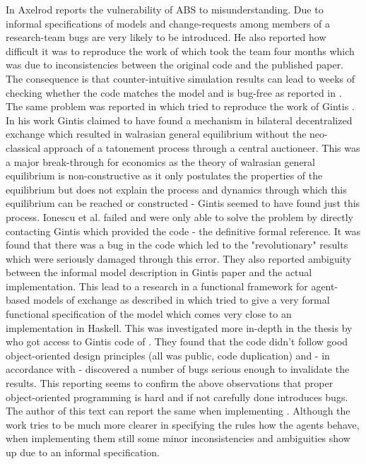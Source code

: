 In \cite{axelrod_chapter_2006} Axelrod reports the vulnerability of ABS to misunderstanding. Due to informal specifications of models and change-requests among members of a research-team bugs are very likely to be introduced. He also reported how difficult it was to reproduce the work of \cite{axelrod_convergence_1995} which took the team four months which was due to inconsistencies between the original code and the published paper. The consequence is that counter-intuitive simulation results can lead to weeks of checking whether the code matches the model and is bug-free as reported in \cite{axelrod_advancing_1997}.
The same problem was reported in \cite{ionescu_dependently-typed_2012} which tried to reproduce the work of Gintis \cite{gintis_emergence_2006}. In his work Gintis claimed to have found a mechanism in bilateral decentralized exchange which resulted in walrasian general equilibrium without the neo-classical approach of a tatonement process through a central auctioneer. This was a major break-through for economics as the theory of walrasian general equilibrium is non-constructive as it only postulates the properties of the equilibrium \cite{colell_microeconomic_1995} but does not explain the process and dynamics through which this equilibrium can be reached or constructed - Gintis seemed to have found just this process. Ionescu et al. \cite{ionescu_dependently-typed_2012} failed and were only able to solve the problem by directly contacting Gintis which provided the code - the definitive formal reference. It was found that there was a bug in the code which led to the "revolutionary" results which were seriously damaged through this error. They also reported ambiguity between the informal model description in Gintis paper and the actual implementation.
This lead to a research in a functional framework for agent-based models of exchange as described in \cite{botta_functional_2011} which tried to give a very formal functional specification of the model which comes very close to an implementation in Haskell.
This was investigated more in-depth in the thesis by \cite{evensen_extensible_2010} who got access to Gintis code of \cite{gintis_emergence_2006}. They found that the code didn't follow good object-oriented design principles (all was public, code duplication) and - in accordance with \cite{ionescu_dependently-typed_2012} - discovered a number of bugs serious enough to invalidate the results. This reporting seems to confirm the above observations that proper object-oriented programming is hard and if not carefully done introduces bugs.
The author of this text can report the same when implementing \cite{epstein_growing_1996}. Although the work tries to be much more clearer in specifying the rules how the agents behave, when implementing them still some minor inconsistencies and ambiguities show up due to an informal specification.
